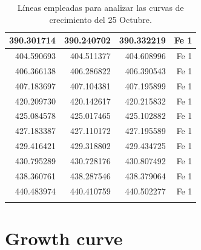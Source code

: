 \documentclass[12pt,oneside,openany,letter]{book}
\begin{document}
\begin{longtable}{|r|r|r|r|}
390.301714                                & 390.240702                               & 390.332219                              & Fe 1                               \\ \hline
404.590693                                & 404.511377                               & 404.608996                              & Fe 1                               \\ \hline
406.366138                                & 406.286822                               & 406.390543                              & Fe 1                               \\ \hline
407.183697                                & 407.104381                               & 407.195899                              & Fe 1                               \\ \hline
420.209730                                & 420.142617                               & 420.215832                              & Fe 1                               \\ \hline
425.084578                                & 425.017465                               & 425.102882                              & Fe 1                               \\ \hline
427.183387                                & 427.110172                               & 427.195589                              & Fe 1                               \\ \hline
429.416421                                & 429.318802                               & 429.434725                              & Fe 1                               \\ \hline
430.795289                                & 430.728176                               & 430.807492                              & Fe 1                               \\ \hline
438.360761                                & 438.287546                               & 438.379064                              & Fe 1                               \\ \hline
440.483974                                & 440.410759                               & 440.502277                              & Fe 1                               \\ \hline

\caption{Líneas empleadas para analizar las curvas de crecimiento del 25 Octubre.}
\label{table:lines2}
\end{longtable}
\chapter{Growth curve}\label{apendiceCoG}
\end{document}
